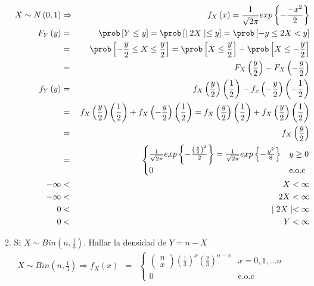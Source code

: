 \begin{enumerate}
\begin{enumerate}
\begin{eqnarray*}
 X \sim N \left(0,1 \right)  &\Rightarrow& f_{X}\left( x \right)= \frac{1}{\sqrt{2\pi}  }exp \left\{ - \frac{- x^2}{2} \right\}\\
 F_{Y} \left(y \right) &=& \prob \left[Y \leq y \right] = \prob \left[ \mid2X \mid \leq y \right] = \prob \left[-y \leq 2X < y \right]\\
 &=& \prob \left[ - \frac{y}{2} \leq X \leq \frac{y}{2} \right]= \prob \left[X \leq \frac{y}{2} \right] - \prob \left[ X \leq - \frac{y}{2}\right]\\
 &=& F_{X} \left(\frac{y}{2} \right)- F_{X} \left(- \frac{y}{2} \right)\\
 f_{Y} \left(y \right) &=& f_{X}\left(\frac{y}{2}  \right) \left(\frac{1}{2} \right) - f_{x} \left(-\frac{y}{2}  \right) \left(-\frac{1}{2} \right)\\
 &=& f_{X} \left(\frac{y}{2}  \right) \left(\frac{1}{2} \right)  + f_{X} \left(-\frac{y}{2}  \right) \left(\frac{1}{2} \right)  = f_{X} \left(\frac{y}{2}  \right) \left(\frac{1}{2} \right)  + f_{X} \left(\frac{y}{2}  \right) \left(\frac{1}{2} \right)\\
 &=& f_{X} \left( \frac{y}{2} \right)\\
 &=& \begin{cases}
 \frac{1}{\sqrt{2\pi}  }exp \left\{ - \frac{\left(\frac{y}{2} \right)^2 }{2} \right\}= \frac{1}{\sqrt{2\pi}  }exp \left\{ - \frac{y^2}{8} \right\} &  y \geq 0\\
 0 & \textrm{e.o.c}
 \end{cases}\\
 -\infty &<& X < \infty\\
  -\infty &<& 2X < \infty\\
 0 &<& \mid 2X \mid < \infty\\
  0 &<& Y < \infty\\
\end{eqnarray*}
\item Si $X \sim Bin \left( n, \frac{1}{3} \right) $. Hallar la densidad de $Y = n-X$
\begin{eqnarray*}
X \sim Bin \left(n, \frac{1}{3} \right) \Rightarrow f_{X} \left(x \right) &=& \begin{cases}
\left(\begin{array}{c} n \\ x
\end{array}\right) \left(\frac{1}{3} \right)^{x} \left(\frac{2}{3} \right)^{n-x} & x= 0,1, \ldots n \\
 0 & \textrm{e.o.c}
 \end{cases}\\

\end{eqnarray*}
\end{enumerate}
\end{enumerate}
